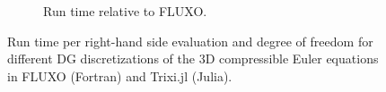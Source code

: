 \documentclass[hidelinks]{juliacon} %
\begin{document}
\begin{figure}[!ht]
\begin{subfigure}{\linewidth}
    \caption{Run time relative to FLUXO.}
  \end{subfigure}%
  \caption{Run time per right-hand side evaluation and degree of freedom for
           different DG discretizations of the 3D compressible Euler equations
           in FLUXO (Fortran) and Trixi.jl (Julia).}
  \label{fig:PID-Euler}
\end{figure}
\end{document}

